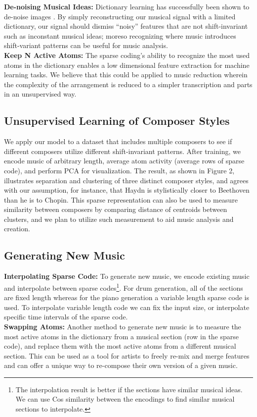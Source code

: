 \documentclass[11pt,a4paper]{article}
\begin{document}
 \textbf{De-noising Musical Ideas: } Dictionary learning has successfully been shown to de-noise images  \cite{Beckouche_2013}. By simply reconstructing our musical signal with a limited dictionary, our signal should dismiss “noisy” features that are not shift-invariant such as  inconstant musical ideas; moreso recognizing where music introduces shift-variant patterns can be useful for music analysis. 
 \\
 \textbf{Keep N Active Atoms: } The sparse coding’s ability to recognize the most used atoms in the dictionary enables a low dimensional feature extraction for machine learning tasks. We believe that this could be applied to music reduction wherein the complexity of the arrangement is reduced to a simpler transcription and parts in an unsupervised way.

\subsection{Unsupervised Learning of Composer Styles }
We apply our model to a dataset that includes multiple composers to see if different composers utilize different shift-invariant patterns. After training, we encode music of arbitrary length, average atom activity (average rows of sparse code), and perform PCA for visualization. The result, as shown in Figure 2, illustrates separation and clustering of three distinct composer styles, and agrees with our assumption, for instance, that Haydn is stylistically closer to Beethoven than he is to Chopin. This sparse representation can also be used to measure similarity between composers by comparing distance of centroids between clusters, and we plan to utilize such measurement to aid music analysis and creation.

\subsection{Generating New Music}
 \textbf{Interpolating Sparse Code: } To generate new music, we encode existing music and interpolate between sparse codes\footnote{The interpolation result is better if the sections have similar musical ideas. We can use Cos similarity between the encodings to find similar musical sections to interpolate.}. For drum generation, all of the sections are fixed length whereas for the piano generation a variable length sparse code is used. To interpolate variable length code we can fix the input size, or interpolate specific time intervals of the sparse code.
 \\
 \textbf{Swapping Atoms: } Another method to generate new music is to measure the most active atoms in the dictionary from a musical section (row in the sparse code), and replace them with the most active atoms from a different musical section. This can be used as a tool for artists to freely re-mix and merge features and can offer a unique way to re-compose their own version of a given music.
\end{document}
